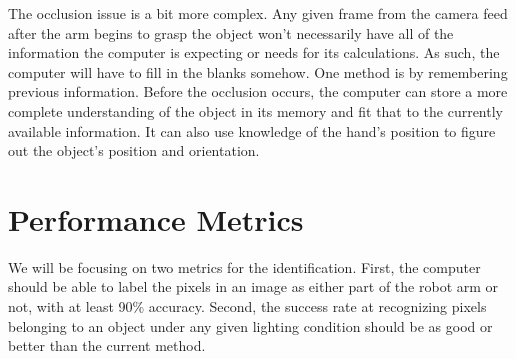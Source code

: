 \documentclass{article}
\begin{document}
The occlusion issue is a bit more complex.
Any given frame from the camera feed after the arm begins to grasp the object won't necessarily have all of the information the computer is expecting or needs for its calculations.
As such, the computer will have to fill in the blanks somehow.
One method is by remembering previous information.
Before the occlusion occurs, the computer can store a more complete understanding of the object in its memory and fit that to the currently available information.
It can also use knowledge of the hand's position to figure out the object's position and orientation.


\section{Performance Metrics}
We will be focusing on two metrics for the identification.
First, the computer should be able to label the pixels in an image as either part of the robot arm or not, with at least 90\% accuracy.
Second, the success rate at recognizing pixels belonging to an object under any given lighting condition should be as good or better than the current method.
\end{document}
